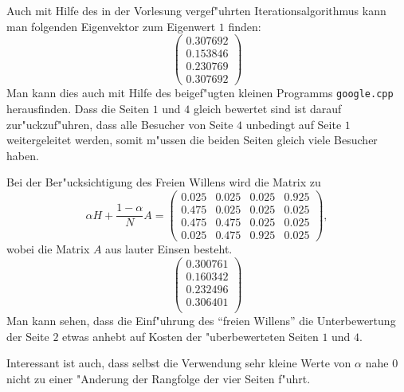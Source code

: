 \begin{loesung}
\begin{teilaufgaben}
Auch mit Hilfe des in der Vorlesung vergef"uhrten Iterationsalgorithmus
kann man folgenden Eigenvektor zum Eigenwert $1$ finden:
\[
\begin{pmatrix}
0.307692\\
0.153846\\
0.230769\\
0.307692
\end{pmatrix}
\]
Man kann dies auch mit Hilfe des beigef"ugten kleinen Programms
{\tt google.cpp} herausfinden.
Dass die Seiten $1$ und $4$ gleich bewertet sind ist darauf zur"uckzuf"uhren,
dass alle Besucher von Seite $4$ unbedingt auf Seite $1$ weitergeleitet
werden, somit m"ussen die beiden Seiten gleich viele Besucher haben.
\item
Bei der Ber"ucksichtigung des Freien Willens wird die Matrix zu
\[
\alpha H+\frac{1-\alpha}N A
=
\left(\begin{matrix}
0.025&0.025&0.025&0.925\\
0.475&0.025&0.025&0.025\\
0.475&0.475&0.025&0.025\\
0.025&0.475&0.925&0.025
\end{matrix}\right),
\]
wobei die Matrix $A$ aus lauter Einsen besteht.
\[
\left(\begin{matrix}
0.300761\\
0.160342\\
0.232496\\
0.306401\\
\end{matrix}\right)
\]
Man kann sehen, dass die Einf"uhrung des ``freien Willens'' die
Unterbewertung der Seite $2$ etwas anhebt auf Kosten der
"uberbewerteten Seiten $1$ und $4$.

Interessant ist auch, dass selbst die Verwendung sehr kleine Werte von
$\alpha$ nahe $0$ nicht zu einer "Anderung der Rangfolge der vier
Seiten f"uhrt.
\qedhere
\end{teilaufgaben}
\end{loesung}

